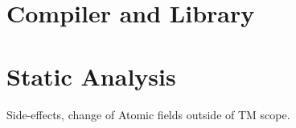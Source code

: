 \makeatletter {}\makeatother
{}
\section{Compiler and Library}
\section{Static Analysis}
Side-effects, change of Atomic fields outside of TM scope.

\worksheetend